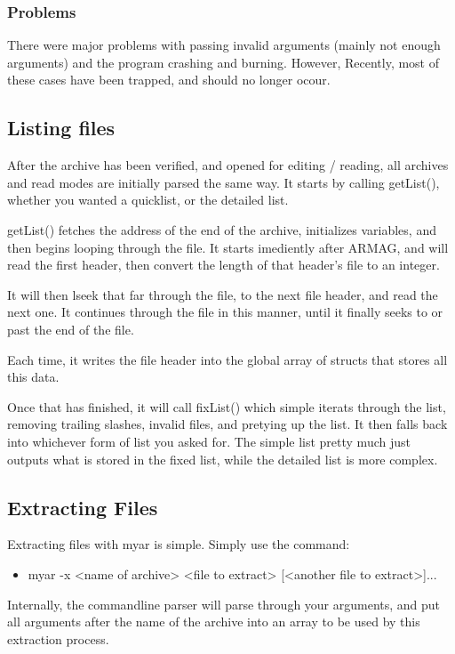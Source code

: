 \documentclass[letterpaper,10pt,titlepage]{article}
\begin{document}
\subsubsection{Problems}

There were major problems with passing invalid arguments (mainly not enough arguments) and the program crashing and burning.  However, Recently, most of these cases have been trapped, and should no longer ocour.

\subsection{Listing files}

After the archive has been verified, and opened for editing / reading, all archives and read modes are initially parsed the same way.  It starts by calling getList(), whether you wanted a quicklist, or the detailed list.

getList() fetches the address of the end of the archive, initializes variables, and then begins looping through the file.  It starts imediently after ARMAG, and will read the first header, then convert the length of that header's file to an integer.

It will then lseek that far through the file, to the next file header, and read the next one.  It continues through the file in this manner, until it finally seeks to or past the end of the file.

Each time, it writes the file header into the global array of structs that stores all this data.

Once that has finished, it will call fixList() which simple iterats through the list, removing trailing slashes, invalid files, and pretying up the list.  It then falls back into whichever form of list you asked for.  The simple list pretty much just outputs what is stored in the fixed list, while the detailed list is more complex.

\subsection{Extracting Files}

Extracting files with myar is simple.  Simply use the command:
\begin{itemize}
\item myar -x <name of archive> <file to extract> [<another file to extract>]...
\end{itemize}

Internally, the commandline parser will parse through your arguments, and put all arguments after the name of the archive into an array to be used by this extraction process.
\end{document}
